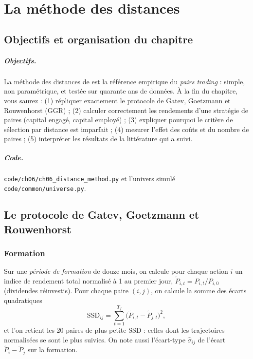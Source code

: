 \chapter{La méthode des distances}
\label{ch:6}

\section{Objectifs et organisation du chapitre}

\paragraph{Objectifs.} La méthode des distances de \citet{gatev2006} est la référence empirique du \emph{pairs trading} : simple, non paramétrique, et testée sur quarante ans de données. À la fin du chapitre, vous saurez : (1) répliquer exactement le protocole de Gatev, Goetzmann et Rouwenhorst (GGR) ; (2) calculer correctement les rendements d'une stratégie de paires (capital engagé, capital employé) ; (3) expliquer pourquoi le critère de sélection par distance est imparfait ; (4) mesurer l'effet des coûts et du nombre de paires ; (5) interpréter les résultats de la littérature qui a suivi.

\paragraph{Code.} \texttt{code/ch06/ch06\_distance\_method.py} et l'univers simulé \texttt{code/common/universe.py}.

\section{Le protocole de Gatev, Goetzmann et Rouwenhorst}

\subsection{Formation}

Sur une \emph{période de formation} de douze mois, on calcule pour chaque action $i$ un indice de rendement total normalisé à 1 au premier jour, $\tilde P_{i,t} = P_{i,t}/P_{i,0}$ (dividendes réinvestis). Pour chaque paire $(i,j)$, on calcule la somme des écarts quadratiques
\[
\mathrm{SSD}_{ij} = \sum_{t=1}^{T_f}\big(\tilde P_{i,t} - \tilde P_{j,t}\big)^2,
\]
et l'on retient les 20 paires de plus petite SSD : celles dont les trajectoires normalisées se sont le plus suivies. On note aussi l'écart-type $\hat\sigma_{ij}$ de l'écart $\tilde P_i - \tilde P_j$ sur la formation.

